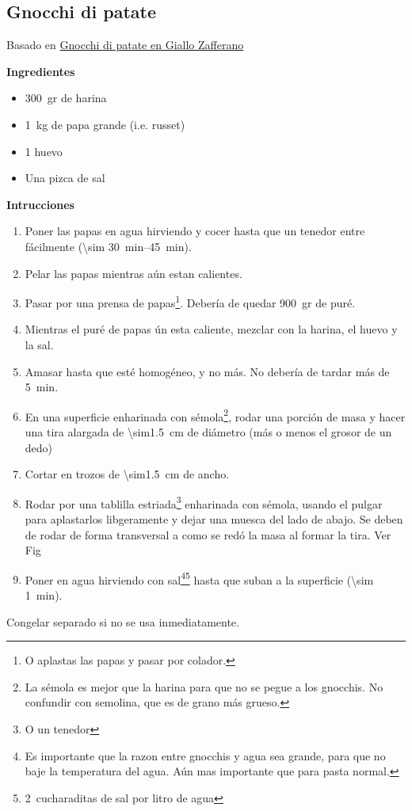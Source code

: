 \subsection{Gnocchi di patate}

Basado en \href{https://ricette.giallozafferano.it/Gnocchi-di-patate.html}{Gnocchi di patate en Giallo Zafferano}

\textbf{Ingredientes}
\begin{itemize}
\item \SI{300}{gr} de harina
\item \SI{1}{kg} de papa grande (i.e. russet)
\item 1 huevo
\item Una pizca de sal
\end{itemize}

\textbf{Intrucciones}
\begin{enumerate}
\item Poner las papas en agua hirviendo y cocer hasta que un tenedor entre fácilmente (\SIrange{\sim 30}{45}{min}).
\item Pelar las papas mientras aún estan calientes.
\item Pasar por una prensa de papas\footnote{O aplastas las papas y pasar por colador.}. Debería de quedar \SI{900}{gr} de puré.
\item Mientras el puré de papas ún esta caliente, mezclar con la harina, el huevo y la sal. 
\item Amasar hasta que esté homogéneo, y no más. No debería de tardar más de \SI{5}{min}.
\item En una superficie enharinada con sémola\footnote{La sémola es mejor que la harina para que no se pegue a los gnocchis. No confundir con semolina, que es de grano más grueso.}, rodar una porción de masa y hacer una tira alargada de \SI{\sim1.5}{cm} de diámetro (más o menos el grosor de un dedo)
\item Cortar en trozos de \SI{\sim1.5}{cm} de ancho.
\item Rodar por una tablilla estriada\footnote{O un tenedor} enharinada con sémola, usando el pulgar para aplastarlos libgeramente y dejar una muesca del lado de abajo. Se deben de rodar de forma transversal a como se redó la masa al formar la tira. Ver Fig 
\item Poner en agua hirviendo con sal\footnote{Es importante que la razon entre gnocchis y agua sea grande, para que no baje la temperatura del agua. Aún mas importante que para pasta normal.}\footnote{\SI{2}{cucharaditas} de sal por litro de agua} hasta que suban a la superficie (\SI{\sim 1}{min}).
\end{enumerate}


Congelar separado si no se usa inmediatamente.
